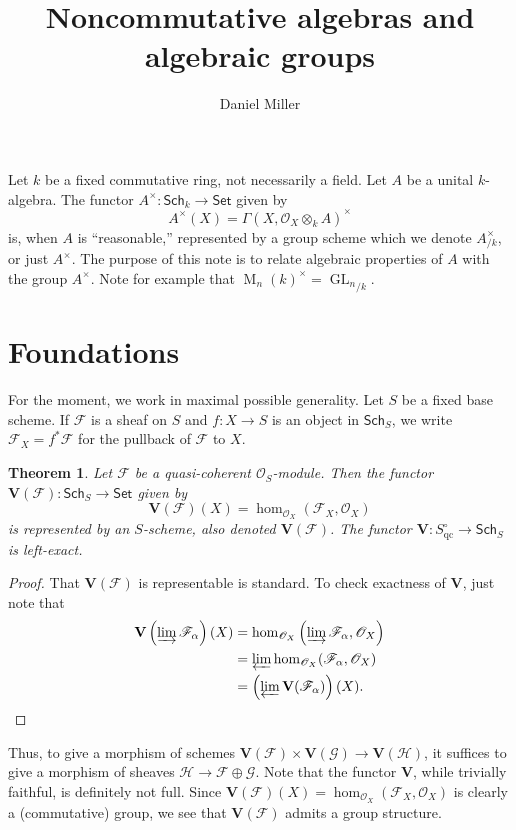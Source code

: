 \documentclass{article}
\title{Noncommutative algebras and algebraic groups}
\author{Daniel Miller}
\DeclareMathOperator{\GL}{GL}
\DeclareMathOperator{\M}{M}
\newcommand{\bV}{\mathbf{V}}
\newcommand{\sF}{\mathscr{F}}
\newcommand{\sG}{\mathscr{G}}
\newcommand{\sH}{\mathscr{H}}
\newcommand{\sO}{\mathscr{O}}
\newcommand{\qc}[1]{{#1}_\mathrm{qc}}
\newcommand{\scheme}{\mathsf{Sch}}
\newcommand{\set}{\mathsf{Set}}
\newtheorem{theorem}[subsection]{Theorem}
\begin{document}
\maketitle





Let $k$ be a fixed commutative ring, not necessarily a field. Let $A$ be a 
unital $k$-algebra. The functor $A^\times\colon \scheme_k\to\set$ given by 
\[
	A^\times(X) = \Gamma(X,\sO_X\otimes_k A)^\times 
\]
is, when $A$ is ``reasonable,'' represented by a group scheme which we denote 
$A_{/k}^\times$, or just $A^\times$. The purpose of this note is to relate 
algebraic properties of $A$ with the group $A^\times$. Note for example that 
$\M_n(k)^\times = {\GL_n}_{/k}$.





\section{Foundations}

For the moment, we work in maximal possible generality. Let $S$ be a fixed base 
scheme. If $\sF$ is a sheaf on $S$ and $f\colon X\to S$ is an object in 
$\scheme_S$, we write $\sF_X=f^\ast \sF$ for the pullback of $\sF$ to $X$. 

\begin{theorem}
Let $\sF$ be a quasi-coherent $\sO_S$-module. Then the functor 
$\bV(\sF)\colon \scheme_S\to \set$ given by 
\[
	\bV(\sF)(X) = \hom_{\sO_X}(\sF_X,\sO_X)
\]
is represented by an $S$-scheme, also denoted $\bV(\sF)$. The functor 
$\bV\colon \qc S^\circ \to \scheme_S$ is left-exact. 
\end{theorem}
\begin{proof}
That $\bV(\sF)$ is representable is standard. To check exactness of $\bV$, just 
note that 
\begin{align*}
	\bV\left(\varinjlim \sF_\alpha\right)(X) 
		&= \hom_{\sO_X}\left(\varinjlim \sF_\alpha,\sO_X\right) \\
		&= \varprojlim \hom_{\sO_X}(\sF_\alpha,\sO_X) \\
		&= \left(\varprojlim \bV(\sF_\alpha)\right)(X) .
\end{align*}
\end{proof}

Thus, to give a morphism of schemes $\bV(\sF)\times \bV(\sG)\to \bV(\sH)$, it 
suffices to give a morphism of sheaves $\sH\to \sF\oplus \sG$. Note that the 
functor $\bV$, while trivially faithful, is definitely not full. Since 
$\bV(\sF)(X)=\hom_{\sO_X}(\sF_X,\sO_X)$ is clearly a (commutative) group, 
we see that $\bV(\sF)$ admits a group structure. 
\end{document}
